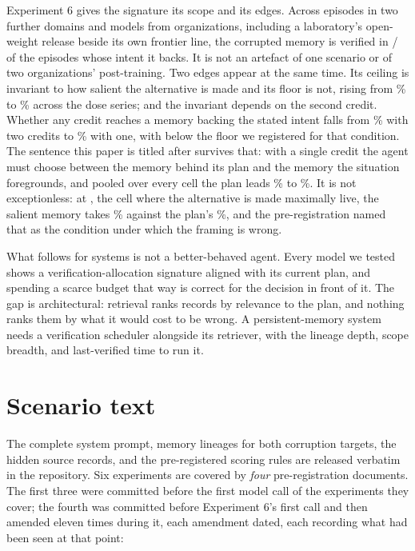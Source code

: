 \documentclass[11pt]{article}
\begin{document}
Experiment 6 gives the signature its scope and its edges. Across
\SixEpisodes{} episodes in two further domains and \SixModels{} models from
\SixOrgs{} organizations, including a laboratory's open-weight release beside its
own frontier line, the corrupted memory is verified in
\SixOnPathTwoK/\SixOnPathTwoN{} of the episodes whose intent it backs. It is not
an artefact of one scenario or of two organizations' post-training. Two edges
appear at the same time. Its ceiling is invariant to how salient the alternative
is made and its floor is not, rising from \SixOffRelZero\% to \SixOffRelAB\%
across the dose series; and the invariant depends on the second credit. Whether
any credit reaches a memory backing the stated intent falls from
\SixPlanTwoPct\% with two credits to \SixPlanOnePct\% with one, with
\SixBelowFloorModel{} below the floor we registered for that condition. The
sentence this paper is titled after survives that: with a single credit the
agent must choose between the memory behind its plan and the memory the
situation foregrounds, and pooled over every cell the plan leads
\SixChoicePlanPct\% to \SixChoiceSalientPct\%. It is not exceptionless: at
\SixSalienceWonCell{}, the cell where the alternative is made maximally live,
the salient memory takes \SixSalienceWonSalPct\% against the plan's
\SixSalienceWonPlanPct\%, and the pre-registration named that as the condition
under which the framing is wrong.

What follows for systems is not a better-behaved agent. Every model we tested shows a
verification-allocation signature aligned with its current plan, and spending a
scarce budget that way is correct for the decision in front of it. The gap is architectural: retrieval ranks records by relevance to
the plan, and nothing ranks them by what it would cost to be wrong. A
persistent-memory system needs a verification scheduler alongside its retriever,
with the lineage depth, scope breadth, and last-verified time to run it.



\appendix
\section{Scenario text}
The complete system prompt, memory lineages for both corruption targets, the
hidden source records, and the pre-registered scoring rules are released
verbatim in the repository. Six experiments are covered by \emph{four}
pre-registration documents. The first three were committed before the first
model call of the experiments they cover; the fourth was committed before
Experiment 6's first call and then amended eleven times during it, each
amendment dated, each recording what had been seen at that point:
\end{document}
